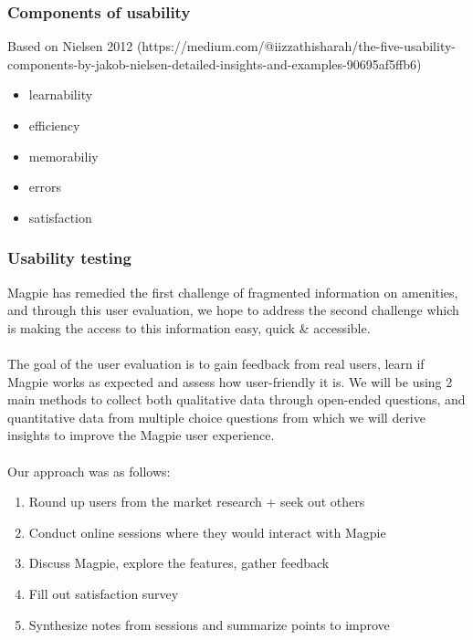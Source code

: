 \subsubsection{Components of usability}
Based on Nielsen 2012 (https://medium.com/@iizzathisharah/the-five-usability-components-by-jakob-nielsen-detailed-insights-and-examples-90695af5ffb6)

\begin{itemize}
    \item learnability
    \item efficiency
    \item memorabiliy
    \item errors
    \item satisfaction
\end{itemize}

\newpage
\subsubsection{Usability testing}
Magpie has remedied the first challenge of fragmented information on
amenities, and through this user evaluation, we hope to address the second challenge
which is making the access to this information easy, quick \& accessible.\\\\

The goal of the user evaluation is to gain feedback from real users, learn if
Magpie works as expected and assess how user-friendly it is. We will be using 2
main methods to collect both qualitative data through open-ended questions, and
quantitative data from multiple choice questions from which we will derive
insights to improve the Magpie user experience.\\\\

Our approach was as follows:
\begin{enumerate}
    \item Round up users from the market research + seek out others
    \item Conduct online sessions where they would interact with Magpie
    \item Discuss Magpie, explore the features, gather feedback
    \item Fill out satisfaction survey
    \item Synthesize notes from sessions and summarize points to improve
\end{enumerate}

